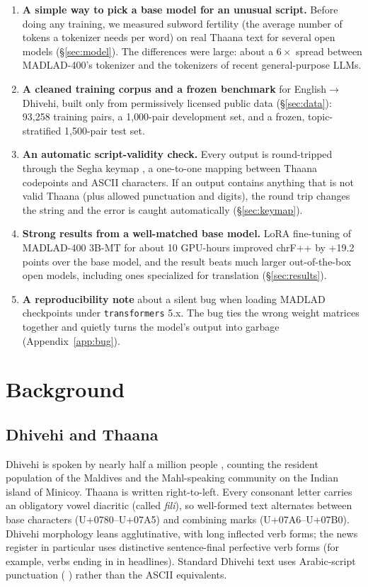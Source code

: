 \documentclass[10pt,twocolumn]{article}
\newcommand{\dv}[1]{{\thaanafont\RL{#1}}}
\begin{document}
\begin{enumerate}
  \item \textbf{A simple way to pick a base model for an unusual script.}
  Before doing any training, we measured subword fertility (the average
  number of tokens a tokenizer needs per word) on real Thaana text for
  several open models (\S\ref{sec:model}). The differences were large:
  about a $6\times$ spread between MADLAD-400's tokenizer and the
  tokenizers of recent general-purpose LLMs.
  \item \textbf{A cleaned training corpus and a frozen benchmark} for
  English$\to$Dhivehi, built only from permissively licensed public data
  (\S\ref{sec:data}): 93{,}258 training pairs, a 1{,}000-pair development
  set, and a frozen, topic-stratified 1{,}500-pair test set.
  \item \textbf{An automatic script-validity check.} Every output is
  round-tripped through the Segha keymap \citep{divtransliteration}, a
  one-to-one mapping between Thaana codepoints and ASCII characters. If an
  output contains anything that is not valid Thaana (plus allowed
  punctuation and digits), the round trip changes the string and the error
  is caught automatically (\S\ref{sec:keymap}).
  \item \textbf{Strong results from a well-matched base model.} LoRA
  fine-tuning of MADLAD-400 3B-MT for about 10 GPU-hours improved chrF++
  by +19.2 points over the base model, and the result beats much larger
  out-of-the-box open models, including ones specialized for translation
  (\S\ref{sec:results}).
  \item \textbf{A reproducibility note} about a silent bug when loading
  MADLAD checkpoints under \texttt{transformers} 5.x. The bug ties the
  wrong weight matrices together and quietly turns the model's output into
  garbage (Appendix~\ref{app:bug}).
\end{enumerate}

\section{Background}

\subsection{Dhivehi and Thaana}

Dhivehi is spoken by nearly half a million people
\citep{ethnologue28,census2022}, counting the resident population of the
Maldives and the Mahl-speaking community on the Indian island of Minicoy.
Thaana is written right-to-left. Every consonant letter carries an
obligatory vowel diacritic (called \emph{fili}), so well-formed text
alternates between base characters (U+0780--U+07A5) and combining marks
(U+07A6--U+07B0). Dhivehi morphology leans agglutinative, with long
inflected verb forms; the news register in particular uses distinctive
sentence-final perfective verb forms (for example, verbs ending in
\dv{ކޮށްފި} in headlines). Standard Dhivehi text uses Arabic-script
punctuation (\dv{،} \dv{؛} \dv{؟}) rather than the ASCII equivalents.
\end{document}
